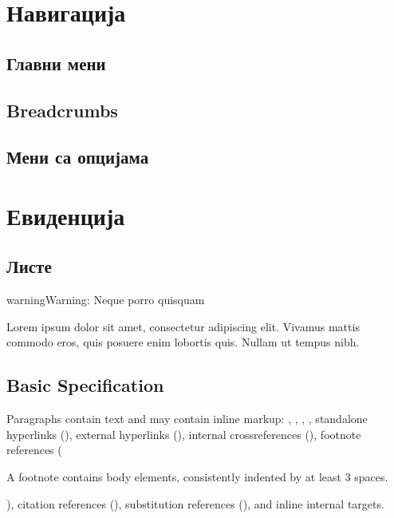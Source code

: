 \documentclass[a4paper,10pt,english]{report}
\begin{document}
\section{Навигација}
\label{\detokenize{prirucnik/navigacija:navigacija}}\label{\detokenize{prirucnik/navigacija:id1}}\label{\detokenize{prirucnik/navigacija::doc}}

\subsection{Главни мени}
\label{\detokenize{prirucnik/navigacija:id2}}

\subsection{Breadcrumbs}
\label{\detokenize{prirucnik/navigacija:breadcrumbs}}

\subsection{Мени са опцијама}
\label{\detokenize{prirucnik/navigacija:id3}}

\section{Евиденција}
\label{\detokenize{prirucnik/evidencija:evidencija}}\label{\detokenize{prirucnik/evidencija:id1}}\label{\detokenize{prirucnik/evidencija::doc}}

\subsection{Листе}
\label{\detokenize{prirucnik/evidencija:id2}}
\begin{sphinxadmonition}{warning}{Warning:}
Neque porro quisquam

Lorem ipsum dolor sit amet, consectetur adipiscing elit. Vivamus mattis commodo eros, quis posuere enim lobortis quis. Nullam ut tempus nibh.
\end{sphinxadmonition}


\subsection{Basic Specification}
\label{\detokenize{prirucnik/evidencija:basic-specification}}
Paragraphs contain text and may contain inline markup: , , , , standalone hyperlinks (), external hyperlinks (), internal cross\sphinxhyphen{}references ({\hyperref[\detokenize{prirucnik/evidencija:example}]{}}), footnote references (%
\begin{footnote}[1]\sphinxAtStartFootnote
A footnote contains body elements, consistently
indented by at least 3 spaces.
%
\end{footnote}), citation references (), substitution references (), and \label{\detokenize{prirucnik/evidencija:inline-internal-targets}}inline internal targets.
\end{document}
